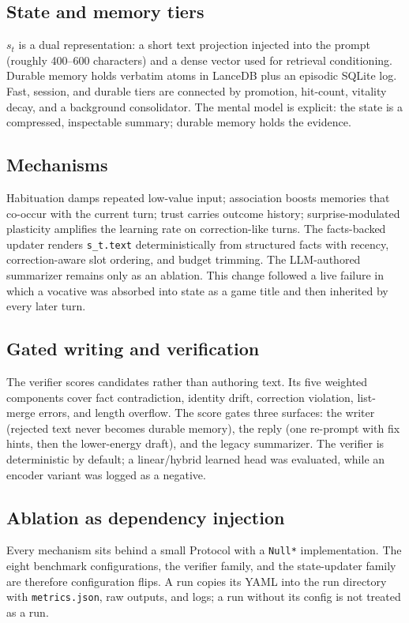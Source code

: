 \documentclass[11pt]{article}
\begin{document}
\subsection{State and memory tiers}
$s_t$ is a dual representation: a short text projection injected into the prompt (roughly 400--600 characters) and a dense vector used for retrieval conditioning. Durable memory holds verbatim atoms in LanceDB plus an episodic SQLite log. Fast, session, and durable tiers are connected by promotion, hit-count, vitality decay, and a background consolidator. The mental model is explicit: the state is a compressed, inspectable summary; durable memory holds the evidence.

\subsection{Mechanisms}
Habituation damps repeated low-value input; association boosts memories that co-occur with the current turn; trust carries outcome history; surprise-modulated plasticity amplifies the learning rate on correction-like turns. The facts-backed updater renders \texttt{s\_t.text} deterministically from structured facts with recency, correction-aware slot ordering, and budget trimming. The LLM-authored summarizer remains only as an ablation. This change followed a live failure in which a vocative was absorbed into state as a game title and then inherited by every later turn.

\subsection{Gated writing and verification}
The verifier scores candidates rather than authoring text. Its five weighted components cover fact contradiction, identity drift, correction violation, list-merge errors, and length overflow. The score gates three surfaces: the writer (rejected text never becomes durable memory), the reply (one re-prompt with fix hints, then the lower-energy draft), and the legacy summarizer. The verifier is deterministic by default; a linear/hybrid learned head was evaluated, while an encoder variant was logged as a negative.

\subsection{Ablation as dependency injection}
Every mechanism sits behind a small Protocol with a \texttt{Null*} implementation. The eight benchmark configurations, the verifier family, and the state-updater family are therefore configuration flips. A run copies its YAML into the run directory with \texttt{metrics.json}, raw outputs, and logs; a run without its config is not treated as a run.
\end{document}

